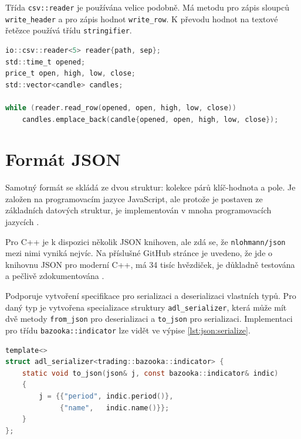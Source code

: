 Třída \texttt{csv::reader} je používána velice podobně.
Má metodu pro zápis sloupců \texttt{write\_header} a pro zápis hodnot \texttt{write\_row}.
K převodu hodnot na textové řetězce používá třídu \texttt{stringifier}.

\begin{lstlisting}[caption={~Ukázka čtení svíček pomocí \texttt{io::csv::reader}},label={lst:read:candles},captionpos=t,abovecaptionskip=-\medskipamount,belowcaptionskip=\medskipamount,language=C]
io::csv::reader<5> reader{path, sep};
std::time_t opened;
price_t open, high, low, close;
std::vector<candle> candles;

while (reader.read_row(opened, open, high, low, close))
    candles.emplace_back(candle{opened, open, high, low, close});
\end{lstlisting}

\section{Formát JSON}
Samotný formát se skládá ze dvou struktur: kolekce párů klíč-hodnota a pole.
Je založen na programovacím jazyce JavaScript, ale protože je postaven ze základních datových struktur, je implementován v mnoha programovacích jazycích \cite{json}.

Pro C++ je k dispozici několik JSON knihoven, ale zdá se, že \texttt{nlohmann/json} mezi nimi vyniká nejvíc.
Na příslušné GitHub stránce je uvedeno, že jde o knihovnu JSON pro moderní C++, má 34 tisíc hvězdiček, je důkladně testována a pečlivě zdokumentována \cite{lohmann}.

Podporuje vytvoření specifikace pro serializaci a deserializaci vlastních typů.
Pro daný typ je vytvořena specializace struktury \texttt{adl\_serializer}, která může mít dvě metody \texttt{from\_json} pro deserializaci a \texttt{to\_json} pro serializaci.
Implementaci pro třídu \texttt{bazooka::indicator} lze vidět ve výpise \ref{lst:json:serialize}.

\begin{lstlisting}[caption={~Implementace deserializace pro vlastní datový typ},label={lst:json:serialize},captionpos=t,abovecaptionskip=-\medskipamount,belowcaptionskip=\medskipamount,language=C]
template<>
struct adl_serializer<trading::bazooka::indicator> {
    static void to_json(json& j, const bazooka::indicator& indic)
    {
        j = {{"period", indic.period()},
             {"name",   indic.name()}};
    }
};
\end{lstlisting}

